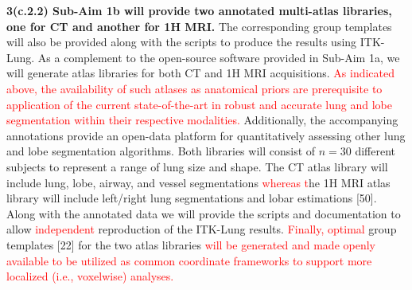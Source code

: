 \documentclass[11pt,]{article}
\begin{document}
\textbf{3(c.2.2) Sub-Aim 1b will provide two annotated multi-atlas
libraries, one for CT and another for 1H MRI.} The corresponding group
templates will also be provided along with the scripts to produce the
results using ITK-Lung. As a complement to the open-source software
provided in Sub-Aim 1a, we will generate atlas libraries for both CT and
1H MRI acquisitions.
\textcolor{red}{As indicated above, the availability of such atlases as anatomical priors
are prerequisite to application of the current state-of-the-art in robust and accurate lung
and lobe segmentation within their respective modalities.} Additionally,
the accompanying annotations provide an open-data platform for
quantitatively assessing other lung and lobe segmentation algorithms.
Both libraries will consist of \(n=30\) different subjects to represent
a range of lung size and shape. The CT atlas library will include lung,
lobe, airway, and vessel segmentations \textcolor{red}{whereas t}he 1H
MRI atlas library will include left/right lung segmentations and lobar
estimations {[}50{]}. Along with the annotated data we will provide the
scripts and documentation to allow \textcolor{red}{independent}
reproduction of the ITK-Lung results. \textcolor{red}{Finally, optimal}
group templates {[}22{]} for the two atlas libraries
\textcolor{red}{will be generated and made openly available to be utilized as common coordinate
frameworks to support more localized (i.e., voxelwise) analyses.}
\end{document}
